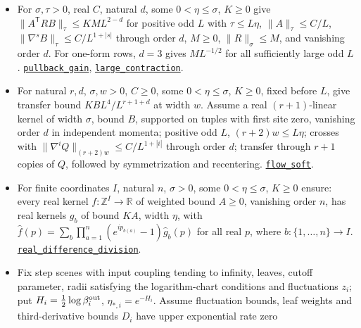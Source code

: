 \documentclass[
  letterpaper,
  11pt]{article}
\providecommand{\tightlist}{%
  \setlength{\itemsep}{0pt}\setlength{\parskip}{0pt}}
\begin{document}
\begin{itemize}
\tightlist
\item
  For \(\sigma,\tau>0\), real \(C\), natural \(d\), some
  \(0<\eta\le\sigma\), \(K\ge0\) give
  \(\|A^{\mathsf T}RB\|_\tau\le KML^{2-d}\) for positive odd \(L\) with
  \(\tau\le L\eta\), \(\|A\|_\tau\le C/L\),
  \(\|\nabla^sB\|_\tau\le C/L^{1+|s|}\) through order \(d\), \(M\ge0\),
  \(\|R\|_\sigma\le M\), and vanishing order \(d\). For one-form rows,
  \(d=3\) gives \(ML^{-1/2}\) for all sufficiently large odd \(L\).
  \href{https://github.com/yang-mills-group/OpenAI-YM-20261028/blob/3456e5e75cf8d4cd558955a5c7638fba2d68f464/YM/RG08/Flat/Pullback.lean\#L56-L110}{\texttt{pullback\_gain}},
  \href{https://github.com/yang-mills-group/OpenAI-YM-20261028/blob/3456e5e75cf8d4cd558955a5c7638fba2d68f464/YM/RG08/Flat/KStep.lean\#L130-L146}{\texttt{large\_contraction}}.
\item
  For natural \(r,d\), \(\sigma,w>0\), \(C\ge0\), some
  \(0<\eta\le\sigma\), \(K\ge0\), fixed before \(L\), give transfer
  bound \(KBL^4/L^{r+1+d}\) at width \(w\). Assume a real
  \((r+1)\)-linear kernel of width \(\sigma\), bound \(B\), supported on
  tuples with first site zero, vanishing order \(d\) in independent
  momenta; positive odd \(L\), \((r+2)w\le L\eta\); crosses with
  \(\|\nabla^iQ\|_{(r+2)w}\le C/L^{1+|i|}\) through order \(d\);
  transfer through \(r+1\) copies of \(Q\), followed by symmetrization
  and recentering.
  \href{https://github.com/yang-mills-group/OpenAI-YM-20261028/blob/3456e5e75cf8d4cd558955a5c7638fba2d68f464/YM/RG08/Ballast/Slide.lean\#L44-L90}{\texttt{flow\_soft}}.
\item
  For finite coordinates \(I\), natural \(n\), \(\sigma>0\), some
  \(0<\eta\le\sigma\), \(K\ge0\) ensure: every real kernel
  \(f:\mathbb Z^I\to\mathbb R\) of weighted bound \(A\ge0\), vanishing
  order \(n\), has real kernels \(g_b\) of bound \(KA\), width \(\eta\),
  with
  \(\widehat f(p)=\sum_b\prod_{a=1}^n(e^{ip_{b(a)}}-1)\widehat g_b(p)\)
  for all real \(p\), where \(b:\{1,\ldots,n\}\to I\).
  \href{https://github.com/yang-mills-group/OpenAI-YM-20261028/blob/3456e5e75cf8d4cd558955a5c7638fba2d68f464/YM/RG08/Flat/Differences.lean\#L46-L92}{\texttt{real\_difference\_division}}.
\item
  Fix step scenes with input coupling tending to infinity, leaves,
  cutoff parameter, radii satisfying the logarithm-chart conditions and
  fluctuations \(z_i\); put \(H_i=\frac12\log\beta_i^{\rm out}\),
  \(\eta_{*,i}=e^{-H_i}\). Assume fluctuation bounds, leaf weights and
  third-derivative bounds \(D_i\) have upper exponential rate zero

\end{itemize}
\end{document}
